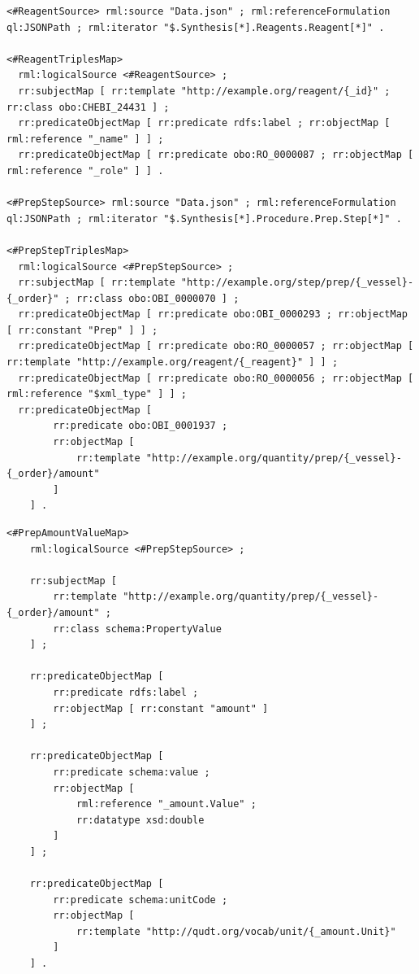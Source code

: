 \begin{lstlisting}[float=htbp,style=turtle,caption={Part of RML mapping focused on reagents and preparation steps},label={lst:application_mof_rml_example_2}]
<#ReagentSource> rml:source "Data.json" ; rml:referenceFormulation ql:JSONPath ; rml:iterator "$.Synthesis[*].Reagents.Reagent[*]" .

<#ReagentTriplesMap>
  rml:logicalSource <#ReagentSource> ;
  rr:subjectMap [ rr:template "http://example.org/reagent/{_id}" ; rr:class obo:CHEBI_24431 ] ;
  rr:predicateObjectMap [ rr:predicate rdfs:label ; rr:objectMap [ rml:reference "_name" ] ] ;
  rr:predicateObjectMap [ rr:predicate obo:RO_0000087 ; rr:objectMap [ rml:reference "_role" ] ] .

<#PrepStepSource> rml:source "Data.json" ; rml:referenceFormulation ql:JSONPath ; rml:iterator "$.Synthesis[*].Procedure.Prep.Step[*]" .

<#PrepStepTriplesMap>
  rml:logicalSource <#PrepStepSource> ;
  rr:subjectMap [ rr:template "http://example.org/step/prep/{_vessel}-{_order}" ; rr:class obo:OBI_0000070 ] ;
  rr:predicateObjectMap [ rr:predicate obo:OBI_0000293 ; rr:objectMap [ rr:constant "Prep" ] ] ;
  rr:predicateObjectMap [ rr:predicate obo:RO_0000057 ; rr:objectMap [ rr:template "http://example.org/reagent/{_reagent}" ] ] ;
  rr:predicateObjectMap [ rr:predicate obo:RO_0000056 ; rr:objectMap [ rml:reference "$xml_type" ] ] ;
  rr:predicateObjectMap [
        rr:predicate obo:OBI_0001937 ;
        rr:objectMap [
            rr:template "http://example.org/quantity/prep/{_vessel}-{_order}/amount"
        ]
    ] .
\end{lstlisting}

\begin{lstlisting}[float=htbp,style=turtle,caption={Part of RML mapping focused on creating amount value nodes for preparation steps},label={lst:application_mof_rml_example_3}]
<#PrepAmountValueMap>
    rml:logicalSource <#PrepStepSource> ;

    rr:subjectMap [
        rr:template "http://example.org/quantity/prep/{_vessel}-{_order}/amount" ;
        rr:class schema:PropertyValue
    ] ;

    rr:predicateObjectMap [
        rr:predicate rdfs:label ;
        rr:objectMap [ rr:constant "amount" ]
    ] ;

    rr:predicateObjectMap [
        rr:predicate schema:value ;
        rr:objectMap [
            rml:reference "_amount.Value" ;
            rr:datatype xsd:double
        ]
    ] ;

    rr:predicateObjectMap [
        rr:predicate schema:unitCode ;
        rr:objectMap [
            rr:template "http://qudt.org/vocab/unit/{_amount.Unit}"
        ]
    ] .
\end{lstlisting}

